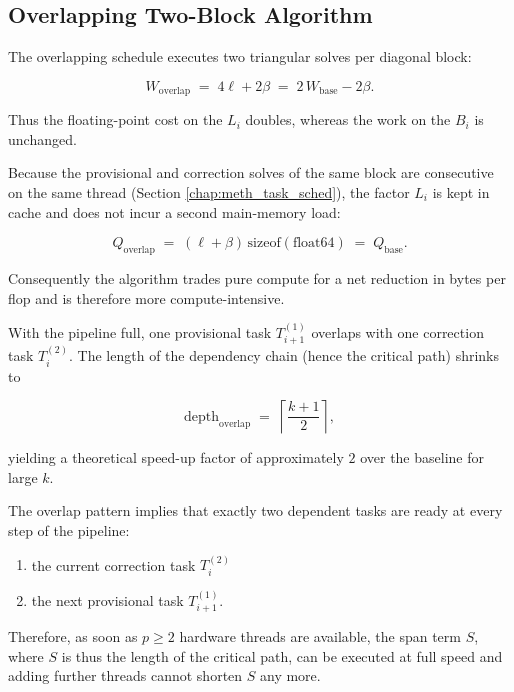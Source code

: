 \subsection{Overlapping Two-Block Algorithm}
\label{sec:parallel_performance}
The overlapping schedule executes two triangular solves per
diagonal block:

\begin{equation}
  W_{\mathrm{overlap}}
  \;=\;
  4\ell + 2\beta
  \;=\;
  2\,W_{\mathrm{base}}
  - 2\beta .
\end{equation}

Thus the floating-point cost on the $L_i$ doubles, whereas the work on
the $B_i$ is unchanged.

Because the provisional and correction solves of the same block are
consecutive on the same thread (Section \ref{chap:meth_task_sched}),
the factor $L_i$ is kept in cache and does not incur a second
main-memory load:

\begin{equation}
  Q_{\mathrm{overlap}}
  \;=\;
  (\ell + \beta)\,\mathrm{sizeof}(\text{float64})
  \;=\;
  Q_{\mathrm{base}} .
\end{equation}

Consequently the algorithm trades pure compute for a net reduction in
bytes per flop and is therefore more compute-intensive.

With the pipeline full, one provisional task $T^{(1)}_{i+1}$ overlaps
with one correction task $T^{(2)}_{i}$.
The length of the dependency chain (hence the critical path) shrinks to

$$
  \mathrm{depth}_{\mathrm{overlap}}
  \;=\;
  \left\lceil \frac{k+1}{2} \right\rceil,
$$

yielding a theoretical speed-up factor of approximately $2$ over the
baseline for large $k$.

The overlap pattern implies that exactly two dependent tasks are
ready at every step of the pipeline:
\begin{enumerate}
    \item the current correction task $T^{(2)}_{i}$
    \item the next provisional task  $T^{(1)}_{i+1}$.
\end{enumerate}

Therefore, as soon as $p\geq 2$ hardware threads are available, the
span term $S$, where $S$ is thus the length of the critical path, can be executed at full speed and adding further
threads cannot shorten $S$ any more.

